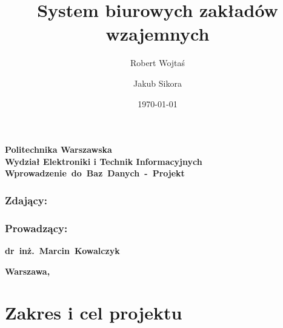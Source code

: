 \documentclass{mwrep}
\title{\bf System biurowych zakładów wzajemnych \vskip 0.1cm}
\author{Robert Wojtaś \and Jakub Sikora}
\date{\today}
\begin{document}
\makeatletter
\renewcommand{\maketitle}{\begin{titlepage}
		\begin{center}{
				\LARGE {\bf Politechnika Warszawska}}\\
			\vspace{0.4cm}
			{\LARGE {\bf Wydział Elektroniki i Technik Informacyjnych}}\\
			\vspace{5cm}
			{\bf \LARGE \mbox{Wprowadzenie do Baz Danych - Projekt} \vskip 0.1cm}
		\end{center}
		\vspace{0.1cm}

		\begin{center}
			{\bf \LARGE \@title}
		\end{center}

		\vspace{10cm}
		\begin{paracol}{2}
			\addtocontents{toc}{\protect\setcounter{tocdepth}{1}}
			\subsection*{Zdający:}
			\bf{ \Large{ \noindent\@author \par}}
			\addtocontents{toc}{\protect\setcounter{tocdepth}{2}}

			\switchcolumn \addtocontents{toc}{\protect\setcounter{tocdepth}{1}}
			\subsection*{Prowadzący:}
			\bf{\Large{\noindent \mbox{dr inż. Marcin Kowalczyk}}}
			\addtocontents{toc}{\protect\setcounter{tocdepth}{2}}

		\end{paracol}
		\vspace*{\stretch{6}}
		\begin{center}
			\bf{\large{Warszawa, \@date\vskip 0.1cm}}
		\end{center}
	\end{titlepage}
}
\makeatother
\maketitle

\tableofcontents

\chapter{Zakres i cel projektu}
\end{document}
